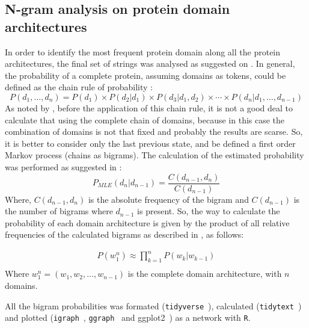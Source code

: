 \documentclass[11pt]{article}
\begin{document}
\subsection*{N-gram analysis on protein domain architectures}
In order to identify the most frequent protein domain along all the protein 
architectures, the final set of strings was analysed as suggested on \cite{Yu:2019}.
In general, the probability of a complete protein, assuming domains as tokens, could be
defined as the chain rule of probability \cite{Jurafsky:2018Book}:
\begin{equation}\label{eqProbAll}
P(d_1,\ldots,d_n) = P(d_1) \times P(d_2|d_1) \times P(d_3|d_1,d_2) \times \cdots \times P(d_n|d_1, \ldots , d_{n-1})
\end{equation}
As noted by \cite{Yu:2019}, before the application of this chain rule, 
it is not a good deal to calculate that using the complete chain of domains, because in this case
the combination of domains is not that fixed and probably the results are scarse. So, 
it is better to consider only the last previous state, and be defined a first order Markov 
process (chains as bigrams). The calculation of the estimated probability was 
performed as suggested in \cite{Yu:2019}:
\begin{equation}\label{eqEST}
P_{MLE} (d_n|d_{n-1}) = \frac{C (d_{n-1},d_n)}{C (d_{n-1})}
\end{equation}
Where, $C(d_{n-1},d_n)$ is the absolute frequency of the bigram and $C(d_{n-1})$ is the number
of bigrams where $d_{n-1}$ is present. So, the way to calculate the probability of 
each domain architecture is given by the product of all relative frequencies of the 
calculated bigrams as described in \cite{Jurafsky:2018Book}, as follows:

\begin{equation}\label{eqFinalProd}
  \begin{split}
    P(w_1^n) \approx \prod_{k=1}^n P(w_k|w_{k-1}) \\ 
  \end{split}
\end{equation}
Where $w_1^n = (w_1, w_2, \dots, w_{n-1})$ is the complete domain architecture, with $n$ domains.

All the bigram probabilities was formated (\texttt{tidyverse}~\cite{wickham:2017}), calculated 
(\texttt{tidytext}~\cite{Wickham:2016}) and plotted (\texttt{igraph}~\cite{Csardi:2006}, 
\texttt{ggraph}~\cite{Pedersen:2018} and ggplot2~\cite{Wickham:2016a}) as a network with 
\texttt{R}.
\end{document}

